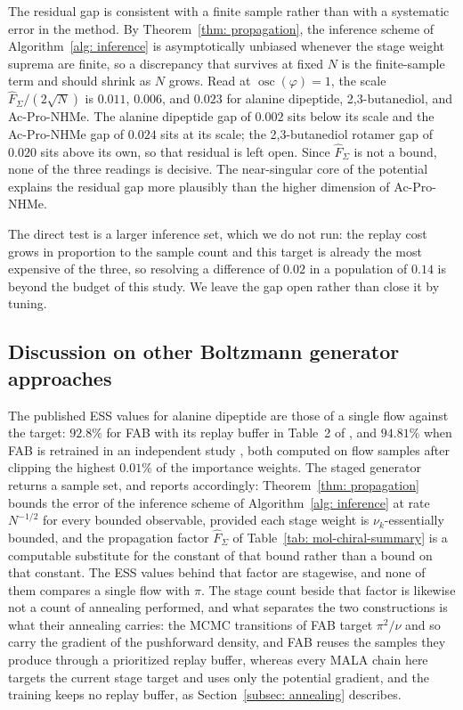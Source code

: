 \documentclass{article}
\begin{document}
The residual gap is consistent with a finite sample rather than with a systematic error in the method. By Theorem~\ref{thm: propagation}, {\color{blue}the inference scheme of Algorithm~\ref{alg: inference}} is asymptotically unbiased whenever the stage weight suprema are finite, so a discrepancy that survives at fixed \(N\) is the finite-sample term and should shrink as \(N\) grows. {\color{purple}Read at $\operatorname{osc}(\varphi)=1$, the scale $\hat F_\Sigma/(2\sqrt N)$ is \(0.011\), \(0.006\), and \(0.023\) for alanine dipeptide, 2,3-butanediol, and Ac-Pro-NHMe. The alanine dipeptide gap of \(0.002\) sits below its scale and the Ac-Pro-NHMe gap of \(0.024\) sits at its scale; the 2,3-butanediol rotamer gap of \(0.020\) sits above its own, so that residual is left open. Since $\hat F_\Sigma$ is not a bound, none of the three readings is decisive.} The near-singular core of the potential explains the residual gap more plausibly than the higher dimension of Ac-Pro-NHMe.

The direct test is a larger inference set, which we do not run: the replay cost grows in proportion to the sample count and this target is already the most expensive of the three, so resolving a difference of \(0.02\) in a population of \(0.14\) is beyond the budget of this study. We leave the gap open rather than close it by tuning.


\subsection{{\color{blue}Discussion on other Boltzmann generator approaches}}
\label{subsec: mol-discussion}

{\color{blue}The published ESS values for alanine dipeptide are those of a single flow against the target: \(92.8\%\) for FAB with its replay buffer in Table~2 of \citet{midgley2022flow}, and \(94.81\%\) when FAB is retrained in an independent study \citep{schopmans2025temperature}, both computed on flow samples after clipping the highest \(0.01\%\) of the importance weights. The staged generator returns a sample set, and reports accordingly: Theorem~\ref{thm: propagation} bounds the error of the inference scheme of Algorithm~\ref{alg: inference} at rate \(N^{-1/2}\) for every bounded observable, provided each stage weight is $\nu_k$-essentially bounded, and the propagation factor $\hat F_\Sigma$ of Table~\ref{tab: mol-chiral-summary} is a computable substitute for the constant of that bound rather than a bound on that constant. The ESS values behind that factor are stagewise, and none of them compares a single flow with $\pi$. The stage count beside that factor is likewise not a count of annealing performed, and what separates the two constructions is what their annealing carries: the MCMC transitions of FAB target $\pi^2/\nu$ and so carry the gradient of the pushforward density, and FAB reuses the samples they produce through a prioritized replay buffer, whereas every MALA chain here targets the current stage target and uses only the potential gradient, and the training keeps no replay buffer, as Section~\ref{subsec: annealing} describes.}
\end{document}
